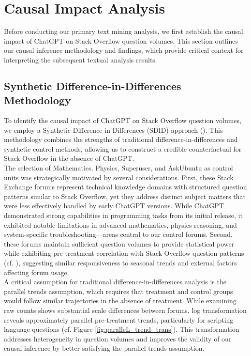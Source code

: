 \section{Causal Impact Analysis}
Before conducting our primary text mining analysis, we first establish the causal impact of ChatGPT on Stack Overflow question volumes. This section outlines our causal inference methodology and findings, which provide critical context for interpreting the subsequent textual analysis results.


\subsection{Synthetic Difference-in-Differences Methodology}
To identify the causal impact of ChatGPT on Stack Overflow question volumes, we employ a Synthetic Difference-in-Differences (SDID) approach (\cite{arkhangelsky_synthetic_2021}). This methodology combines the strengths of traditional difference-in-differences and synthetic control methods, allowing us to construct a credible counterfactual for Stack Overflow in the absence of ChatGPT.\\

The selection of Mathematics, Physics, Superuser, and AskUbuntu as control units was strategically motivated by several considerations. First, these Stack Exchange forums represent technical knowledge domains with structured question patterns similar to Stack Overflow, yet they address distinct subject matters that were less effectively handled by early ChatGPT versions. While ChatGPT demonstrated strong capabilities in programming tasks from its initial release, it exhibited notable limitations in advanced mathematics, physics reasoning, and system-specific troubleshooting—areas central to our control forums. Second, these forums maintain sufficient question volumes to provide statistical power while exhibiting pre-treatment correlation with Stack Overflow question patterns (cf. ), suggesting similar responsiveness to seasonal trends and external factors affecting forum usage.\\

A critical assumption for traditional difference-in-differences analysis is the parallel trends assumption, which requires that treatment and control groups would follow similar trajectories in the absence of treatment. While examining raw counts shows substantial scale differences between forums, log transformation reveals approximately parallel pre-treatment trends, particularly for scripting language questions (cf. Figure \ref{fig:paralleL_trend_trans}). This transformation addresses heterogeneity in question volumes and improves the validity of our causal inference by better satisfying the parallel trends assumption.\\

